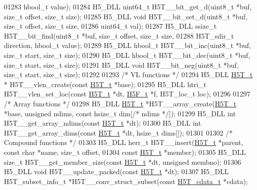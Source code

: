 \begin{DoxyCode}
01283              hbool\_t value);
01284 H5\_DLL uint64\_t H5T\_\_bit\_get\_d(uint8\_t *buf, \textcolor{keywordtype}{size\_t} offset, \textcolor{keywordtype}{size\_t} size);
01285 H5\_DLL \textcolor{keywordtype}{void} H5T\_\_bit\_set\_d(uint8\_t *buf, \textcolor{keywordtype}{size\_t} offset, \textcolor{keywordtype}{size\_t} size,
01286                uint64\_t val);
01287 H5\_DLL ssize\_t H5T\_\_bit\_find(uint8\_t *buf, \textcolor{keywordtype}{size\_t} offset, \textcolor{keywordtype}{size\_t} size,
01288                  H5T\_sdir\_t direction, hbool\_t value);
01289 H5\_DLL hbool\_t H5T\_\_bit\_inc(uint8\_t *buf, \textcolor{keywordtype}{size\_t} start, \textcolor{keywordtype}{size\_t} size);
01290 H5\_DLL hbool\_t H5T\_\_bit\_dec(uint8\_t *buf, \textcolor{keywordtype}{size\_t} start, \textcolor{keywordtype}{size\_t} size);
01291 H5\_DLL \textcolor{keywordtype}{void} H5T\_\_bit\_neg(uint8\_t *buf, \textcolor{keywordtype}{size\_t} start, \textcolor{keywordtype}{size\_t} size);
01292 
01293 \textcolor{comment}{/* VL functions */}
01294 H5\_DLL \hyperlink{struct_h5_t__t}{H5T\_t} * H5T\_\_vlen\_create(\textcolor{keyword}{const} \hyperlink{struct_h5_t__t}{H5T\_t} *base);
01295 H5\_DLL htri\_t H5T\_\_vlen\_set\_loc(\textcolor{keyword}{const} \hyperlink{struct_h5_t__t}{H5T\_t} *dt, \hyperlink{struct_h5_f__t}{H5F\_t} *f, H5T\_loc\_t loc);
01296 
01297 \textcolor{comment}{/* Array functions */}
01298 H5\_DLL \hyperlink{struct_h5_t__t}{H5T\_t} *H5T\_\_array\_create(\hyperlink{struct_h5_t__t}{H5T\_t} *base, \textcolor{keywordtype}{unsigned} ndims, \textcolor{keyword}{const} hsize\_t dim[\textcolor{comment}{/* ndims */}]);
01299 H5\_DLL \textcolor{keywordtype}{int}    H5T\_\_get\_array\_ndims(\textcolor{keyword}{const} \hyperlink{struct_h5_t__t}{H5T\_t} *dt);
01300 H5\_DLL \textcolor{keywordtype}{int}    H5T\_\_get\_array\_dims(\textcolor{keyword}{const} \hyperlink{struct_h5_t__t}{H5T\_t} *dt, hsize\_t dims[]);
01301 
01302 \textcolor{comment}{/* Compound functions */}
01303 H5\_DLL herr\_t H5T\_\_insert(\hyperlink{struct_h5_t__t}{H5T\_t} *parent, \textcolor{keyword}{const} \textcolor{keywordtype}{char} *name, \textcolor{keywordtype}{size\_t} offset,
01304         \textcolor{keyword}{const} \hyperlink{struct_h5_t__t}{H5T\_t} *member);
01305 H5\_DLL \textcolor{keywordtype}{size\_t} H5T\_\_get\_member\_size(\textcolor{keyword}{const} \hyperlink{struct_h5_t__t}{H5T\_t} *dt, \textcolor{keywordtype}{unsigned} membno);
01306 H5\_DLL \textcolor{keywordtype}{void} H5T\_\_update\_packed(\textcolor{keyword}{const} \hyperlink{struct_h5_t__t}{H5T\_t} *dt);
01307 H5\_DLL H5T\_subset\_info\_t *H5T\_\_conv\_struct\_subset(\textcolor{keyword}{const} \hyperlink{struct_h5_t__cdata__t}{H5T\_cdata\_t} *cdata);

\end{DoxyCode}
